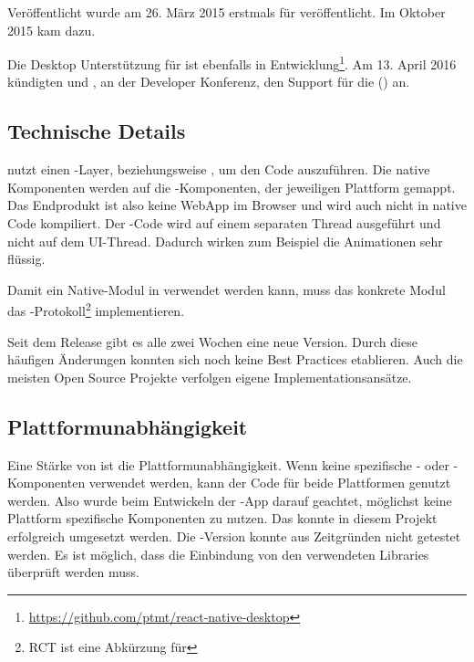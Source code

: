 Veröffentlicht wurde  am 26. März 2015 erstmals für  veröffentlicht.
Im Oktober 2015 kam  dazu.\cite{react-native-release}

Die Desktop Unterstützung für  ist ebenfalls in Entwicklung\footnote{\url{https://github.com/ptmt/react-native-desktop}}. 
Am 13. April 2016 kündigten  und , an der  Developer Konferenz, den Support für die  () an.\cite{react-native-windows} 


\subsection{Technische Details}
 nutzt einen -Layer, beziehungsweise , um den Code auszuführen.\cite{react-native-javascriptcore} 
Die native Komponenten werden auf die -Komponenten, der jeweiligen Plattform gemappt. 
Das Endprodukt ist also keine \gls{WebApp} im Browser und wird auch nicht in native Code kompiliert. 
Der -Code wird auf einem separaten Thread ausgeführt und nicht auf dem UI-Thread. 
Dadurch wirken zum Beispiel die Animationen sehr flüssig.\cite{react-native-javascript-thread}

Damit ein  Native-Modul in  verwendet werden kann, muss das konkrete Modul das -Protokoll\footnote{RCT ist eine Abkürzung für } implementieren. 

Seit dem Release gibt es alle zwei Wochen eine neue Version. 
Durch diese häufigen Änderungen konnten sich noch keine Best Practices etablieren. 
Auch die meisten Open Source Projekte verfolgen eigene Implementationsansätze.


\subsection{Plattformunabhängigkeit}
Eine Stärke von  ist die Plattformunabhängigkeit. 
Wenn keine spezifische - oder -Komponenten verwendet werden, kann der Code für beide Plattformen genutzt werden.
Also wurde beim Entwickeln der -App darauf geachtet, möglichst keine Plattform spezifische Komponenten zu nutzen. 
Das konnte in diesem Projekt erfolgreich umgesetzt werden. 
Die -Version konnte aus Zeitgründen nicht getestet werden. 
Es ist möglich, dass die Einbindung von den verwendeten Libraries überprüft werden muss. 



